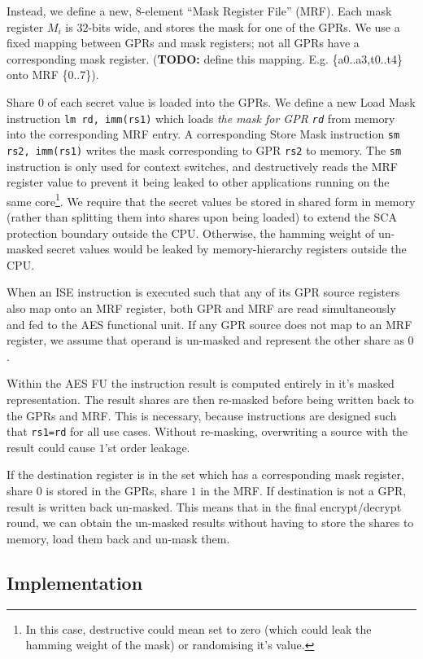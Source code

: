 Instead, we define a new, $8$-element ``Mask Register File'' (MRF).
Each mask register $M_i$ is $32$-bits wide, and stores the mask for
one of the GPRs.
We use a fixed mapping between GPRs and mask registers;
not all GPRs have a corresponding mask register.
({\bf TODO:} define this mapping. E.g. \{a0..a3,t0..t4\} onto MRF \{0..7\}).

Share $0$ of each secret value is loaded into the GPRs.
We define a new Load Mask instruction {\tt lm rd, imm(rs1)} which
loads {\em the mask for GPR {\tt rd}} from memory into the corresponding
MRF entry.
A corresponding Store Mask instruction {\tt sm rs2, imm(rs1)} writes
the mask corresponding to GPR {\tt rs2} to memory.
The {\tt sm} instruction is only used for context switches, and
destructively reads the MRF register value to prevent it being
leaked to other applications running on the same core\footnote{
    In this case, destructive could mean set to zero (which could
    leak the hamming weight of the mask) or randomising it's value.}.
We require that the secret values be stored in shared form in memory
(rather than splitting them into shares upon being loaded)
to extend the SCA protection boundary outside the CPU.
Otherwise, the hamming weight of un-masked secret values would be
leaked by memory-hierarchy registers outside the CPU.

When an ISE instruction is executed such that any of its GPR source
registers also map onto an MRF register, both GPR and MRF are
read simultaneously and fed to the AES functional unit.
If any GPR source does not map to an MRF register, we assume that
operand is un-masked and represent the other share as $0$.

Within the AES FU the instruction result is computed entirely in it's
masked representation.
The result shares are then re-masked before being written back to the
GPRs and MRF.
This is necessary, because  instructions are designed
such that {\tt rs1=rd} for all use cases.
Without re-masking, overwriting a source with the result could cause 
$1$'st order leakage.

If the destination register is in the set which has a corresponding
mask register, share $0$ is stored in the GPRs, share $1$ in the MRF.
If destination is not a GPR, result is written back un-masked.
This means that in the final encrypt/decrypt round, we can obtain
the un-masked results without having to store the shares to memory,
load them back and un-mask them.

\subsection{Implementation}

